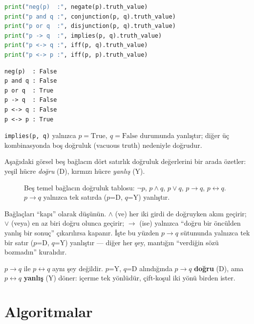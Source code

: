 \begin{lstlisting}[language=Python]
print("neg(p)  :", negate(p).truth_value)
print("p and q :", conjunction(p, q).truth_value)
print("p or q  :", disjunction(p, q).truth_value)
print("p -> q  :", implies(p, q).truth_value)
print("p <-> q :", iff(p, q).truth_value)
print("p <-> p :", iff(p, p).truth_value)
\end{lstlisting}

\begin{lstlisting}[style=output]
neg(p)  : False
p and q : False
p or q  : True
p -> q  : False
p <-> q : False
p <-> p : True
\end{lstlisting}

\texttt{implies(p, q)} yalnızca $p = \text{True},\ q = \text{False}$
durumunda yanlıştır; diğer üç kombinasyonda boş doğruluk (vacuous truth)
nedeniyle doğrudur.

Aşağıdaki görsel beş bağlacın dört satırlık doğruluk değerlerini bir arada
özetler: yeşil hücre \emph{doğru} (D), kırmızı hücre \emph{yanlış} (Y).

\begin{figure}[ht]
\centering

\caption{Beş temel bağlacın doğruluk tablosu: $\neg p$, $p\wedge q$,
$p\vee q$, $p\to q$, $p\leftrightarrow q$. $p\to q$ yalnızca tek satırda
($p$=D, $q$=Y) yanlıştır.}
\label{fig:ch02_baglac_dogruluk}
\end{figure}

\begin{sezgi}
Bağlaçları ``kapı'' olarak düşünün. $\wedge$ (ve) her iki girdi de doğruyken
akım geçirir; $\vee$ (veya) en az biri doğru olunca geçirir; $\to$ (ise)
yalnızca ``doğru bir öncülden yanlış bir sonuç'' çıkarılırsa kapanır. İşte bu
yüzden $p\to q$ sütununda yalnızca tek bir satır ($p$=D, $q$=Y) yanlıştır —
diğer her şey, mantığın ``verdiğin sözü bozmadın'' kuralıdır.
\end{sezgi}

\begin{karsiornek}
$p\to q$ ile $p\leftrightarrow q$ aynı şey değildir. $p$=Y, $q$=D alındığında
$p\to q$ \textbf{doğru} (D), ama $p\leftrightarrow q$ \textbf{yanlış} (Y)
döner: içerme tek yönlüdür, çift-koşul iki yönü birden ister.
\end{karsiornek}

\section{Algoritmalar}
\label{sec:logic_algorithms}

